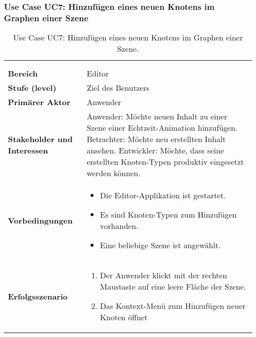 
\subsubsection{Use Case UC7: Hinzufügen eines neuen Knotens im Graphen einer
    Szene}
\label{ssubsec:requirements:use-cases:uc7}

\begin{longtabu}{p{0.5\textwidth}p{0.5\textwidth}}
    \centering\\
    \caption{Use Case UC7: Hinzufügen eines neuen Knotens im Graphen einer
        Szene.}\label{table:uc7-add-new-node}\\
    \toprule
        \textbf{Bereich} &
        Editor \\
    \cmidrule(r){1-1}\cmidrule(lr){2-2}
        \textbf{Stufe (level)} &
        Ziel des Benutzers \\
    \cmidrule(r){1-1}\cmidrule(lr){2-2}
        \textbf{Primärer Aktor} &
        Anwender \\
    \cmidrule(r){1-1}\cmidrule(lr){2-2}
        \textbf{Stakeholder und Interessen} &
        Anwender: Möchte neuen Inhalt zu einer Szene einer
        Echtzeit-Animation hinzufügen.\newline
        Betrachter: Möchte neu erstellten Inhalt ansehen.\newline
        Entwickler: Möchte, dass seine erstellten Knoten-Typen produktiv
        eingesetzt werden können. \\
    \cmidrule(r){1-1}\cmidrule(lr){2-2}
        \textbf{Vorbedingungen} &
        \begin{itemize}
            \item{Die Editor-Applikation ist gestartet.}
            \item{Es sind Knoten-Typen zum Hinzufügen vorhanden.}
            \item{Eine beliebige Szene ist angewählt.}
        \end{itemize} \\
    \cmidrule(r){1-1}\cmidrule(lr){2-2}
        \textbf{Erfolgsszenario} &
        \begin{enumerate}
            \item{Der Anwender klickt mit der rechten Maustaste auf eine
                    leere Fläche der Szene.}
            \item{Das Kontext-Menü zum Hinzufügen neuer Knoten öffnet
}
\end{enumerate}
\end{longtabu}
